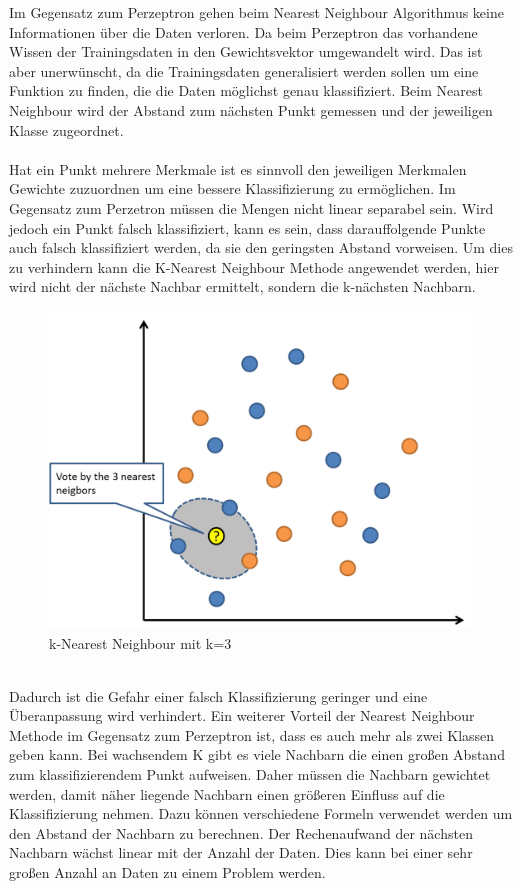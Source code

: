 Im Gegensatz zum Perzeptron gehen beim Nearest Neighbour Algorithmus keine Informationen über die Daten verloren. Da beim Perzeptron das vorhandene Wissen der Trainingsdaten in den Gewichtsvektor umgewandelt wird. Das ist aber unerwünscht, da die Trainingsdaten generalisiert werden sollen um eine Funktion zu finden, die die Daten möglichst genau klassifiziert. Beim Nearest Neighbour wird der Abstand zum nächsten Punkt gemessen und der jeweiligen Klasse zugeordnet.
\\\\
 Hat ein Punkt mehrere Merkmale ist es sinnvoll den jeweiligen Merkmalen Gewichte zuzuordnen um eine bessere Klassifizierung zu ermöglichen. Im Gegensatz zum Perzetron müssen die Mengen nicht linear separabel sein. Wird jedoch ein Punkt falsch klassifiziert, kann es sein, dass darauffolgende Punkte auch falsch klassifiziert werden, da sie den geringsten Abstand vorweisen. Um dies zu verhindern kann die K-Nearest Neighbour Methode angewendet werden, hier wird nicht der nächste Nachbar ermittelt, sondern die k-nächsten Nachbarn.
 \begin{figure}[h]
 	\includegraphics[width=1\linewidth]{Bilder/k_nearest_neighbour}
 	\caption{k-Nearest Neighbour mit k=3}\label{nearest_neigbour}
 \end{figure}  \\
Dadurch ist die Gefahr einer falsch Klassifizierung geringer und eine Überanpassung wird verhindert. Ein weiterer Vorteil der Nearest Neighbour Methode im Gegensatz zum Perzeptron ist, dass es auch mehr als zwei Klassen geben kann. Bei wachsendem K gibt es viele Nachbarn die einen großen Abstand zum klassifizierendem Punkt aufweisen. Daher müssen die Nachbarn gewichtet werden, damit näher liegende Nachbarn einen größeren Einfluss auf die Klassifizierung nehmen. Dazu können verschiedene Formeln verwendet werden um den Abstand der Nachbarn zu berechnen. Der Rechenaufwand der nächsten Nachbarn wächst linear mit der Anzahl der Daten. Dies kann bei einer sehr großen Anzahl an Daten zu einem Problem werden.
